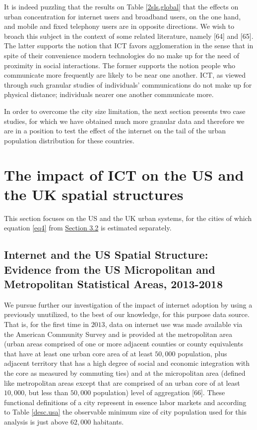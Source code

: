 \documentclass[10pt,letterpaper]{article}
\begin{document}
\color{blue}

It is indeed puzzling that the results on Table \ref{2sls.global} that
the effects on urban concentration for internet users and broadband
users, on the one hand, and mobile and fixed telephony users are in
opposite directions. We wish to broach this subject in the context of
some related literature, namely {[}64{]} and {[}65{]}. The latter
supports the notion that ICT favors agglomeration in the sense that in
spite of their convenience modern technologies do no make up for the
need of proximity in social interactions. The former supports the notion
people who communicate more frequently are likely to be near one
another. ICT, as viewed through such granular studies of individuals'
communications do not make up for physical distance; individuals nearer
one another communicate more.\\
\color{black}

In order to overcome the city size limitation, the next section presents
two case studies, for which we have obtained much more granular data and
therefore we are in a position to test the effect of the internet on the
tail of the urban population distribution for these countries.

\hypertarget{sec5}{%
\section{The impact of ICT on the US and the UK spatial
structures}\label{sec5}}

This section focuses on the US and the UK urban systems, for the cities
of which equation \ref{eq4} from \protect\hyperlink{sec3.2}{Section 3.2}
is estimated separately.

\hypertarget{sec5.1}{%
\subsection{Internet and the US Spatial Structure: Evidence from the US
Micropolitan and Metropolitan Statistical Areas,
2013-2018}\label{sec5.1}}

We pursue further our investigation of the impact of internet adoption
by using a previously unutilized, to the best of our knowledge, for this
purpose data source. That is, for the first time in \(2013\), data on
internet use was made available via the American Community Survey and is
provided at the metropolitan area (urban areas comprised of one or more
adjacent counties or county equivalents that have at least one urban
core area of at least \(50,000\) population, plus adjacent territory
that has a high degree of social and economic integration with the core
as measured by commuting ties) and at the micropolitan area (defined
like metropolitan areas except that are comprised of an urban core of at
least \(10,000\), but less than \(50,000\) population) level of
aggregation {[}66{]}. These functional definitions of a city represent
in essence labor markets and according to Table \ref{desc.usa} the
observable minimum size of city population used for this analysis is
just above \(62,000\) habitants.
\end{document}

